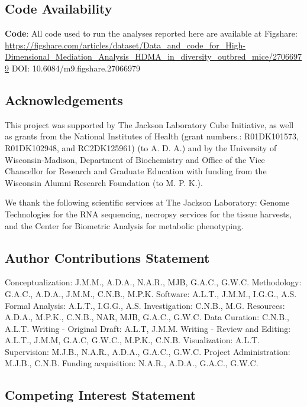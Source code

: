 \documentclass[
]{article}
\begin{document}
\subsection{Code Availability}\label{code-availability}

\textbf{Code}: All code used to run the analyses reported here are
available at Figshare:
\url{https://figshare.com/articles/dataset/Data_and_code_for_High-Dimensional_Mediation_Analysis_HDMA_in_diversity_outbred_mice/27066979}
DOI: 10.6084/m9.figshare.27066979

\pagebreak




\subsection{Acknowledgements}\label{acknowledgements}

This project was supported by The Jackson Laboratory Cube Initiative, as
well as grants from the National Institutes of Health (grant numbers.:
R01DK101573, R01DK102948, and RC2DK125961) (to A. D. A.) and by the
University of Wisconsin-Madison, Department of Biochemistry and Office
of the Vice Chancellor for Research and Graduate Education with funding
from the Wisconsin Alumni Research Foundation (to M. P. K.).

We thank the following scientific services at The Jackson Laboratory:
Genome Technologies for the RNA sequencing, necropsy services for the
tissue harvests, and the Center for Biometric Analysis for metabolic
phenotyping.

\subsection{Author Contributions
Statement}\label{author-contributions-statement}

Conceptualization: J.M.M., A.D.A., N.A.R., MJB, G.A.C., G.W.C.
Methodology: G.A.C., A.D.A., J.M.M., C.N.B., M.P.K. Software: A.L.T.,
J.M.M., I.G.G., A.S. Formal Analysis: A.L.T., I.G.G., A.S.
Investigation: C.N.B., M.G. Resources: A.D.A., M.P.K., C.N.B., NAR, MJB,
G.A.C., G.W.C. Data Curation: C.N.B., A.L.T. Writing - Original Draft:
A.L.T, J.M.M. Writing - Review and Editing: A.L.T., J.M.M, G.A.C,
G.W.C., M.P.K., C.N.B. Visualization: A.L.T. Supervision: M.J.B.,
N.A.R., A.D.A., G.A.C., G.W.C. Project Administration: M.J.B., C.N.B.
Funding acquisition: N.A.R., A.D.A., G.A.C., G.W.C.

\subsection{Competing Interest
Statement}\label{competing-interest-statement}
\end{document}

